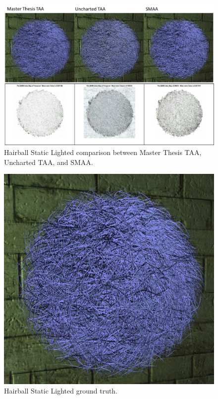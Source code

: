 \documentclass{cslthse-msc}
\begin{document}
\begin{figure}[H]
	\centering
	\includegraphics[scale=0.9]{images/results/hairball_static_lighted.png}
	\caption{Hairball Static Lighted comparison between Master Thesis TAA, Uncharted TAA, and SMAA.}\label{fig:hairball_static_lighted_render}
\end{figure}

\begin{figure}[H]
	\centering
	\includegraphics[scale=0.2]{images/results/hairball_light_sobel_ground_truth.png}
	\caption{Hairball Static Lighted ground truth.}\label{fig:hairball_static_lighted_truth}
\end{figure}
\end{document}
